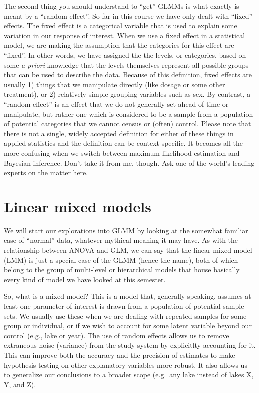 \documentclass[
]{book}
\begin{document}
The second thing you should understand to ``get'' GLMMs is what exactly is meant by a ``random effect''. So far in this course we have only dealt with ``fixed'' effects. The fixed effect is a categorical variable that is used to explain some variation in our response of interest. When we use a fixed effect in a statistical model, we are making the assumption that the categories for this effect are ``fixed''. In other words, we have assigned the the levels, or categories, based on some \emph{a priori} knowledge that the levels themselves represent all possible groups that can be used to describe the data. Because of this definition, fixed effects are usually 1) things that we manipulate directly (like dosage or some other treatment), or 2) relatively simple grouping variables such as sex. By contrast, a ``random effect'' is an effect that we do not generally set ahead of time or manipulate, but rather one which is considered to be a sample from a population of potential categories that we cannot census or (often) control. Please note that there is not a single, widely accepted definition for either of these things in applied statistics and the definition can be context-specific. It becomes all the more confusing when we switch between maximum likelihood estimation and Bayesian inference. Don't take it from me, though. Ask one of the world's leading experts on the matter \href{http://andrewgelman.com/2005/01/25/why_i_dont_use/}{here}.

\hypertarget{linear-mixed-models}{%
\section{Linear mixed models}\label{linear-mixed-models}}

We will start our explorations into GLMM by looking at the somewhat familiar case of ``normal'' data, whatever mythical meaning it may have. As with the relationship between ANOVA and GLM, we can say that the linear mixed model (LMM) is just a special case of the GLMM (hence the name), both of which belong to the group of multi-level or hierarchical models that house basically every kind of model we have looked at this semester.

So, what is a mixed model? This is a model that, generally speaking, assumes at least one parameter of interest is drawn from a population of potential sample sets. We usually use these when we are dealing with repeated samples for some group or individual, or if we wish to account for some latent variable beyond our control (e.g., lake or year). The use of random effects allows us to remove extraneous noise (variance) from the study system by explicitlty accounting for it. This can improve both the accuracy and the precision of estimates to make hypothesis testing on other explanatory variables more robust. It also allows us to generalize our conclusions to a broader scope (e.g.~any lake instead of lakes X, Y, and Z).
\end{document}
